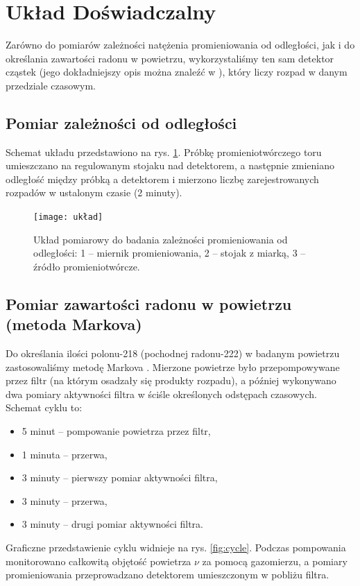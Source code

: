 \documentclass[12pt]{article}
\begin{document}
\section{Układ Doświadczalny}
Zarówno do pomiarów zależności natężenia promieniowania od odległości, jak i do określania zawartości radonu w powietrzu, wykorzystaliśmy ten sam detektor cząstek (jego dokładniejszy opis można znaleźć w \cite{skrypt}), który liczy rozpad w danym przedziale czasowym.

\subsection{Pomiar zależności od odległości}
Schemat układu przedstawiono na rys. \ref{fig:diagram}. Próbkę promieniotwórczego toru umieszczano na regulowanym stojaku nad detektorem, a następnie zmieniano odległość między próbką a detektorem i mierzono liczbę zarejestrowanych rozpadów w ustalonym czasie (2 minuty).

\begin{figure}[H]
	\centering
	\texttt{[image: układ]}
	\caption{Układ pomiarowy do badania zależności promieniowania od odległości: 1 – miernik promieniowania, 2 – stojak z miarką, 3 – źródło promieniotwórcze.}
	\label{fig:diagram}
\end{figure}

\subsection{Pomiar zawartości radonu w powietrzu (metoda Markova)}
Do określania ilości polonu-218 (pochodnej radonu-222) w badanym powietrzu zastosowaliśmy metodę Markova \cite{equation}. Mierzone powietrze było przepompowywane przez filtr (na którym osadzały się produkty rozpadu), a później wykonywano dwa pomiary aktywności filtra w ściśle określonych odstępach czasowych. Schemat cyklu to:
\begin{itemize}
	\item 5 minut – pompowanie powietrza przez filtr,
	\item 1 minuta – przerwa,
	\item 3 minuty – pierwszy pomiar aktywności filtra,
	\item 3 minuty – przerwa,
	\item 3 minuty – drugi pomiar aktywności filtra.
\end{itemize}
Graficzne przedstawienie cyklu widnieje na rys. \ref{fig:cycle}. Podczas pompowania monitorowano całkowitą objętość powietrza \(\nu\) za pomocą gazomierzu, a pomiary promieniowania przeprowadzano detektorem umieszczonym w pobliżu filtra.
\end{document}
